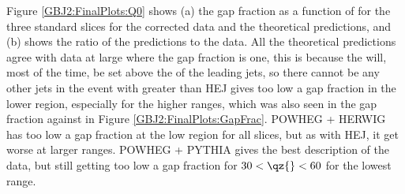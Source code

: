 %
%

Figure \ref{GBJ2:FinalPlots:Q0} shows (a) the gap fraction as a function of \qz{} for the three standard \dy{} slices for the corrected data and the theoretical predictions, and (b) shows the ratio of the predictions to the data.
All the theoretical predictions agree with data at large \qz{} where the gap fraction is one, this is because the \qz{} will, most of the time, be set above the \pt{} of the leading jets, so there cannot be any other jets in the event with \pt{} greater than \qz{}
HEJ gives too low a gap fraction in the lower \qz{} region, especially for the higher \dy{} ranges, which was also seen in the gap fraction against \dy{} in Figure \ref{GBJ2:FinalPlots:GapFrac}.
POWHEG + HERWIG has too low a gap fraction at the low \qz{} region for all \dy{} slices, but as with HEJ, it get worse at larger \dy{} ranges.
POWHEG + PYTHIA gives the best description of the data, but still getting too low a gap fraction for $30<\qz{}<60$ for the lowest \dy{} range.


